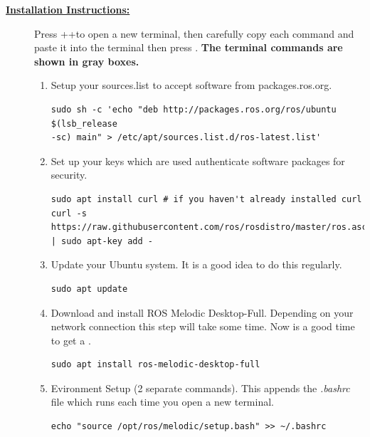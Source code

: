 \documentclass[12pt]{article}
\begin{document}
\begin{description}
\item[\textbf{\underline{Installation Instructions:}}] \hfill \vspace{0mm}

Press \CTRLKey+\ALTKey+\TKey to open a new terminal, then carefully copy each command and paste it into the terminal then press \ENTERKey. { \bf The terminal commands are shown in gray boxes.}


\begin{enumerate}
	
	
	\item  Setup your sources.list to accept software from packages.ros.org.

	\begin{verbatim}
sudo sh -c 'echo "deb http://packages.ros.org/ros/ubuntu $(lsb_release 
-sc) main" > /etc/apt/sources.list.d/ros-latest.list'
	\end{verbatim}
	
	\item Set up your keys which are used authenticate software packages for security.
	
	\begin{verbatim}
sudo apt install curl # if you haven't already installed curl
curl -s https://raw.githubusercontent.com/ros/rosdistro/master/ros.asc 
| sudo apt-key add -
	\end{verbatim}
	
				
	\item Update your Ubuntu system. It is a good idea to do this regularly.  
	
	\begin{verbatim}
sudo apt update
	\end{verbatim}

\newpage
	
	\item Download and install ROS Melodic Desktop-Full. Depending on your network connection this step will take some time. Now is a good time to get a \Coffeecup \Cooley.  
	
	\begin{verbatim}
sudo apt install ros-melodic-desktop-full
	\end{verbatim}

\item Evironment Setup (2 separate commands). This appends the {\it .bashrc} file which runs each time you open a new terminal. 
\begin{verbatim} 
echo "source /opt/ros/melodic/setup.bash" >> ~/.bashrc
\end{verbatim}


\end{enumerate}
\end{description}
\end{document}

